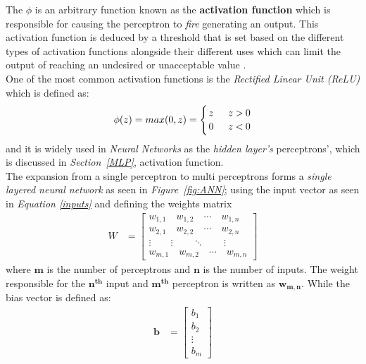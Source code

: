 \documentclass[12pt]{extarticle}
\begin{document}
	The $\phi$ is an arbitrary function known as the \textbf{activation function} which is responsible for causing the perceptron to \emph{fire} generating an output. This activation function is deduced by a threshold that is set based on the different types of activation functions alongside their different uses which can limit the output of reaching an undesired or unacceptable value \cite{siddique2013computational}.\\[5mm]
	One of the most common activation functions is the \emph{Rectified Linear Unit (ReLU)}\cite{agarap2018deep} which is defined as:
	\begin{equation}\label{ReLU}
		\phi(z) = max(0,z)=\Bigg\{ {z \atop 0} {\quad \atop \quad} {z \atop z} {> \atop <} {0 \atop 0}
	\end{equation}
	and it is widely used in \emph{Neural Networks} as the \emph{hidden layer's} perceptrons', which is discussed in \emph{Section~\ref{MLP}}, activation function. 
	\\[5mm]
	The expansion from a single perceptron to multi perceptrons forms a \emph{single layered neural network} as seen in \emph{Figure~\ref{fig:ANN}}; using the input vector as seen in \emph{Equation \ref{inputs}} and defining the weights matrix 
	\begin{align}
		 W &= \begin{bmatrix}\label{weights_expanded}
			w_{1,1}\quad w_{1,2} \quad \cdots \quad w_{1,n}\\
			w_{2,1} \quad w_{2,2} \quad \cdots \quad w_{2,n}\\
			\vdots \qquad \vdots \qquad \ddots \qquad \vdots\\
			w_{m,1} \quad w_{m,2} \quad \cdots \quad w_{m,n}
		\end{bmatrix}
	\end{align}
	where $\bm{m}$ is the number of perceptrons and $\bm{n}$ is the number of inputs. The weight responsible for the $\bm{n^{th}}$ input and $\bm{m^{th}}$ perceptron is written as $\bm{w_{m,n}}$. While the bias vector is defined as:
	\begin{align}
		\bm{b} &= \begin{bmatrix}\label{bias_vector}
			b_1 \\
			b_2 \\
			\vdots \\
			b_m
		\end{bmatrix}
	\end{align}
\end{document}
